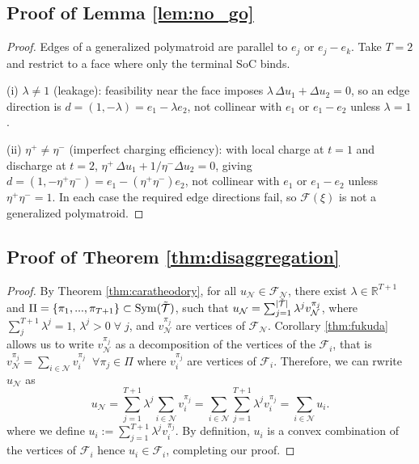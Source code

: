 \subsection{Proof of Lemma \ref{lem:no_go}}
\begin{proof}
    Edges of a generalized polymatroid are parallel to $e_j$ or $e_j-e_k$.
    Take $T=2$ and restrict to a face where only the terminal SoC binds.
    
    (i) $\lambda\ne1$ (leakage): feasibility near the face imposes $\lambda\,\Delta u_1+\Delta u_2=0$, so an edge direction is
    $d=(1,-\lambda)=e_1-\lambda e_2$, not collinear with $e_1$ or $e_1-e_2$ unless $\lambda=1$.
    
    (ii) $\eta^+\ne\eta^-$ (imperfect charging efficiency): with local charge at $t=1$ and discharge at $t=2$,
    $\eta^+\,\Delta u_1+1/\eta^-\Delta u_2=0$, giving
    $d=(1,-\eta^+\eta^-)=e_1-(\eta^+\eta^-)e_2$, not collinear with $e_1$ or $e_1-e_2$ unless $\eta^+\eta^-=1$.
    In each case the required edge directions fail, so $\mathcal{F}(\xi)$ is not a generalized polymatroid.
    \end{proof}

\subsection{Proof of Theorem \ref{thm:disaggregation}}
\begin{proof}
    By Theorem \ref{thm:caratheodory}, for all $u_\mathcal{N} \in \mathcal{F}_\mathcal{N}$, there exist $\lambda \in \mathbb{R}^{T + 1}$ and $\Pi = \{\pi_1, ..., \pi_{T+1}\} \subset \mathrm{Sym}(\Tilde{\mathcal{T}})$, such that $
        u_\mathcal{N} = \sum_{j=1}^{|\Tilde{\mathcal{T}}|} \lambda^j v_\mathcal{N}^{\pi_j}$,
    where $\sum_j^{T+1}\lambda^j = 1$, $\lambda^j > 0 \; \forall \;j$, and  $v_\mathcal{N}^{\pi_j}$ are vertices of $\mathcal{F}_\mathcal{N}$.
    Corollary \ref{thm:fukuda} allows us to write $ v_\mathcal{N}^{\pi_j}$ as a decomposition of the vertices of the $\mathcal{F}_i$, that is $v_\mathcal{N}^{\pi_j} = \sum_{i\in \mathcal{N}} v_i^{\pi_j} \;\;\forall \pi_j \in \Pi$  where $v_i^{\pi_j}$ are vertices of $\mathcal{F}_i$. Therefore, we can rwrite $u_\mathcal{N}$ as
    \begin{equation*}
        u_\mathcal{N} = \sum_{j=1}^{T+1} \lambda^j \sum_{i\in \mathcal{N}} v_i^{\pi_j} = \sum_{i\in \mathcal{N}} \sum_{j=1}^{T+1} \lambda^j v_i^{\pi_j} = \sum_{i\in \mathcal{N}} u_i.
    \end{equation*}
     where we define $u_i := \sum_{j=1}^{T+1} \lambda^j v_i^{\pi_j}$. By definition, $u_i$ is a convex combination of the vertices of $\mathcal{F}_i$ hence $u_i \in \mathcal{F}_i$, completing our proof.
\end{proof}




